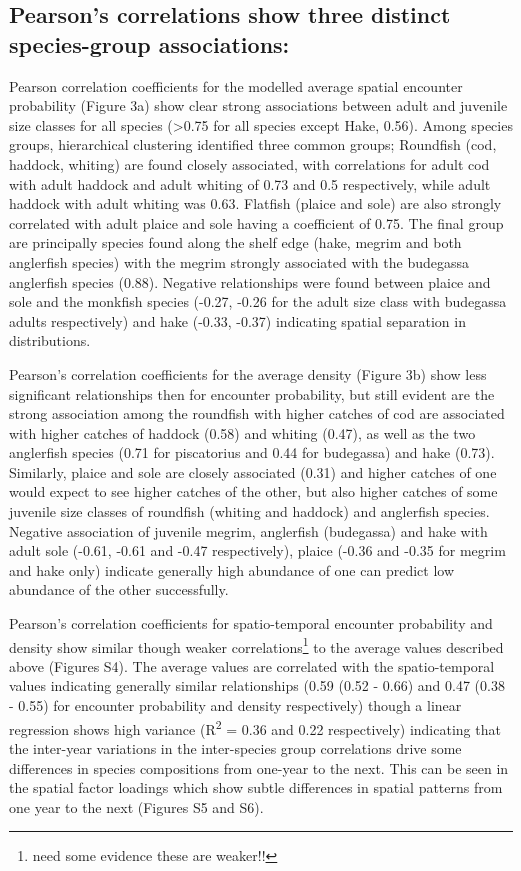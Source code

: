 \documentclass{nature}
\begin{document}
\begin{linenumbers}
\subsection{Pearson's correlations show three distinct species-group
	associations:} 
Pearson correlation coefficients for the modelled average spatial encounter
probability (Figure 3a) show clear strong associations between adult and
juvenile size classes for all species (\textgreater 0.75 for all species except
Hake, 0.56).  Among species groups, hierarchical clustering identified three
common groups; Roundfish (cod, haddock, whiting) are found closely associated,
with correlations for adult cod with adult haddock and adult whiting of 0.73
and 0.5 respectively, while adult haddock with adult whiting was 0.63. Flatfish
(plaice and sole) are also strongly correlated with adult plaice and sole
having a coefficient of 0.75.  The final group are principally species found
along the shelf edge (hake, megrim and both anglerfish species) with the megrim
strongly associated with the budegassa anglerfish species (0.88). Negative
relationships were found between plaice and sole and the monkfish species
(-0.27, -0.26 for the adult size class with budegassa adults respectively) and
hake (-0.33, -0.37) indicating spatial separation in distributions.

Pearson's correlation coefficients for the average density (Figure 3b) show
less significant relationships then for encounter probability, but still
evident are the strong association among the roundfish with higher catches of
cod are associated with higher catches of haddock (0.58) and whiting (0.47), as
well as the two anglerfish species (0.71 for piscatorius and 0.44 for
budegassa) and hake (0.73). Similarly, plaice and sole are closely associated
(0.31) and higher catches of one would expect to see higher catches of the
other, but also higher catches of some juvenile size classes of roundfish
(whiting and haddock) and anglerfish species. Negative association of juvenile
megrim, anglerfish (budegassa) and hake with adult sole (-0.61, -0.61 and -0.47
respectively), plaice (-0.36 and -0.35 for megrim and hake only) indicate
generally high abundance of one can predict low abundance of the other
successfully.

Pearson's correlation coefficients for spatio-temporal encounter probability
and density show similar though weaker correlations\footnote{need some evidence
	these are weaker!!} to the average values described above (Figures S4).
The average values are correlated with the spatio-temporal values indicating
generally similar relationships (0.59 (0.52 - 0.66) and 0.47 (0.38 - 0.55) for
encounter probability and density respectively) though a linear regression
shows high variance (R\textsuperscript{2} = 0.36 and 0.22 respectively)
indicating that the inter-year variations in the inter-species group
correlations drive some differences in species compositions from one-year to
the next.  This can be seen in the spatial factor loadings which show subtle
differences in spatial patterns from one year to the next (Figures S5 and S6). 


\end{linenumbers}
\end{document}
